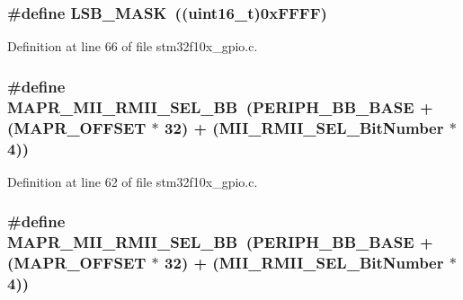\subsubsection[{\texorpdfstring{L\+S\+B\+\_\+\+M\+A\+SK}{LSB_MASK}}]{\setlength{\rightskip}{0pt plus 5cm}\#define L\+S\+B\+\_\+\+M\+A\+SK~(({\bf uint16\+\_\+t})0x\+F\+F\+F\+F)}\hypertarget{group___g_p_i_o___private___defines_ga338d54179ac0da2af2363e3a930bf374}{}\label{group___g_p_i_o___private___defines_ga338d54179ac0da2af2363e3a930bf374}


Definition at line 66 of file stm32f10x\+\_\+gpio.\+c.

\subsubsection[{\texorpdfstring{M\+A\+P\+R\+\_\+\+M\+I\+I\+\_\+\+R\+M\+I\+I\+\_\+\+S\+E\+L\+\_\+\+BB}{MAPR_MII_RMII_SEL_BB}}]{\setlength{\rightskip}{0pt plus 5cm}\#define M\+A\+P\+R\+\_\+\+M\+I\+I\+\_\+\+R\+M\+I\+I\+\_\+\+S\+E\+L\+\_\+\+BB~({\bf P\+E\+R\+I\+P\+H\+\_\+\+B\+B\+\_\+\+B\+A\+SE} + ({\bf M\+A\+P\+R\+\_\+\+O\+F\+F\+S\+ET} $\ast$ 32) + ({\bf M\+I\+I\+\_\+\+R\+M\+I\+I\+\_\+\+S\+E\+L\+\_\+\+Bit\+Number} $\ast$ 4))}\hypertarget{group___g_p_i_o___private___defines_ga00e75433e8a45d7a55c021397cb85aa9}{}\label{group___g_p_i_o___private___defines_ga00e75433e8a45d7a55c021397cb85aa9}


Definition at line 62 of file stm32f10x\+\_\+gpio.\+c.

\subsubsection[{\texorpdfstring{M\+A\+P\+R\+\_\+\+M\+I\+I\+\_\+\+R\+M\+I\+I\+\_\+\+S\+E\+L\+\_\+\+BB}{MAPR_MII_RMII_SEL_BB}}]{\setlength{\rightskip}{0pt plus 5cm}\#define M\+A\+P\+R\+\_\+\+M\+I\+I\+\_\+\+R\+M\+I\+I\+\_\+\+S\+E\+L\+\_\+\+BB~({\bf P\+E\+R\+I\+P\+H\+\_\+\+B\+B\+\_\+\+B\+A\+SE} + ({\bf M\+A\+P\+R\+\_\+\+O\+F\+F\+S\+ET} $\ast$ 32) + ({\bf M\+I\+I\+\_\+\+R\+M\+I\+I\+\_\+\+S\+E\+L\+\_\+\+Bit\+Number} $\ast$ 4))}\hypertarget{group___g_p_i_o___private___defines_ga00e75433e8a45d7a55c021397cb85aa9}{}\label{group___g_p_i_o___private___defines_ga00e75433e8a45d7a55c021397cb85aa9}


